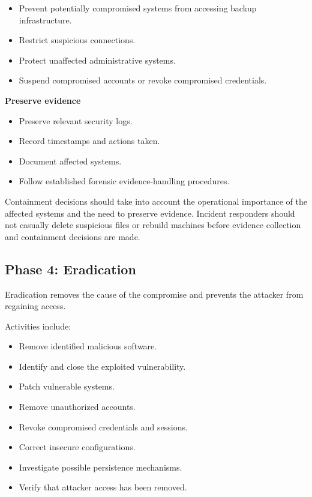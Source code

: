 \begin{itemize}
\item Prevent potentially compromised systems from accessing backup infrastructure.
\item Restrict suspicious connections.
\item Protect unaffected administrative systems.
\item Suspend compromised accounts or revoke compromised credentials.
\end{itemize}

\textbf{Preserve evidence}

\begin{itemize}
\item Preserve relevant security logs.
\item Record timestamps and actions taken.
\item Document affected systems.
\item Follow established forensic evidence-handling procedures.
\end{itemize}

Containment decisions should take into account the operational importance of the affected systems and the need to preserve evidence. Incident responders should not casually delete suspicious files or rebuild machines before evidence collection and containment decisions are made.

\subsection{Phase 4: Eradication}

Eradication removes the cause of the compromise and prevents the attacker from regaining access.

Activities include:

\begin{itemize}
\item Remove identified malicious software.
\item Identify and close the exploited vulnerability.
\item Patch vulnerable systems.
\item Remove unauthorized accounts.
\item Revoke compromised credentials and sessions.
\item Correct insecure configurations.
\item Investigate possible persistence mechanisms.
\item Verify that attacker access has been removed.
\end{itemize}

